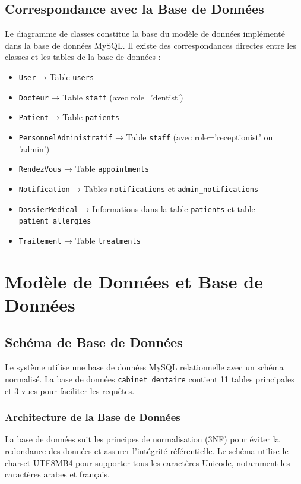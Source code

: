 \documentclass[12pt,a4paper]{report}
\begin{document}
\section{Correspondance avec la Base de Données}

Le diagramme de classes constitue la base du modèle de données implémenté dans la base de données MySQL. Il existe des correspondances directes entre les classes et les tables de la base de données :

\begin{itemize}
    \item \texttt{User} → Table \texttt{users}
    \item \texttt{Docteur} → Table \texttt{staff} (avec role='dentist')
    \item \texttt{Patient} → Table \texttt{patients}
    \item \texttt{PersonnelAdministratif} → Table \texttt{staff} (avec role='receptionist' ou 'admin')
    \item \texttt{RendezVous} → Table \texttt{appointments}
    \item \texttt{Notification} → Tables \texttt{notifications} et \texttt{admin\_notifications}
    \item \texttt{DossierMedical} → Informations dans la table \texttt{patients} et table \texttt{patient\_allergies}
    \item \texttt{Traitement} → Table \texttt{treatments}
\end{itemize}

\chapter{Modèle de Données et Base de Données}

\section{Schéma de Base de Données}

Le système utilise une base de données MySQL relationnelle avec un schéma normalisé. La base de données \texttt{cabinet\_dentaire} contient 11 tables principales et 3 vues pour faciliter les requêtes.

\subsection{Architecture de la Base de Données}

La base de données suit les principes de normalisation (3NF) pour éviter la redondance des données et assurer l'intégrité référentielle. Le schéma utilise le charset UTF8MB4 pour supporter tous les caractères Unicode, notamment les caractères arabes et français.
\end{document}

